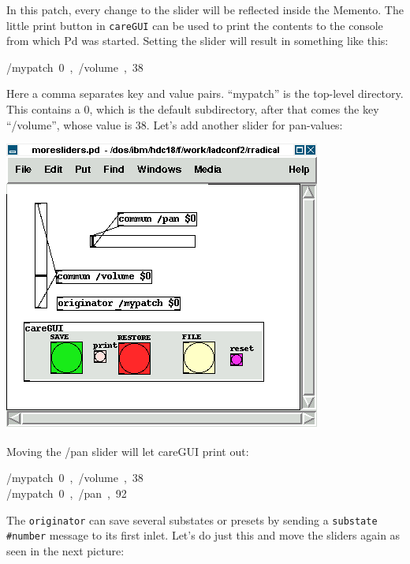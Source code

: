 \documentclass[10pt,english]{scrartcl}
\begin{document}
In this patch, every change to the slider will be reflected inside the
Memento. The little print button in \texttt{careGUI} can be used to print the
contents to the console from which Pd was started. Setting the slider will
result in something like this:
\begin{ttfamily}\begin{flushleft}
\mbox{/mypatch~0~,~/volume~,~38}
\end{flushleft}\end{ttfamily}

Here a comma separates key and value pairs. ``mypatch'' is the top-level
directory. This contains a 0, which is the default subdirectory, after that
comes the key ``/volume'', whose value is 38. Let's add another slider for
pan-values:

\includegraphics{moresliders.png}

Moving the /pan slider will let careGUI print out:
\begin{ttfamily}\begin{flushleft}
\mbox{/mypatch~0~,~/volume~,~38}\\
\mbox{/mypatch~0~,~/pan~,~92}
\end{flushleft}\end{ttfamily}

The \texttt{originator} can save several substates or presets by sending a
\texttt{substate {\#}number} message to its first inlet. Let's do just this and
move the sliders again as seen in the next picture:
\end{document}
